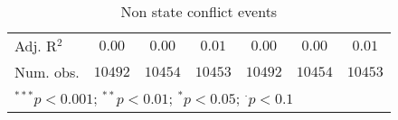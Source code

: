 \begin{sidewaystable}
\begin{center}
{\begin{tabular}{l c c c c c c}
Adj. R$^2$      & $0.00$          & $0.00$          & $0.01$       & $0.00$          & $0.00$          & $0.01$       \\
Num. obs.       & $10492$         & $10454$         & $10453$      & $10492$         & $10454$         & $10453$      \\
\hline
\multicolumn{7}{l}{\scriptsize{$^{***}p<0.001$; $^{**}p<0.01$; $^{*}p<0.05$; $^{\cdot}p<0.1$}}
\end{tabular}
}
\caption{Non state conflict events}
\label{non_state}
\end{center}
\end{sidewaystable}

